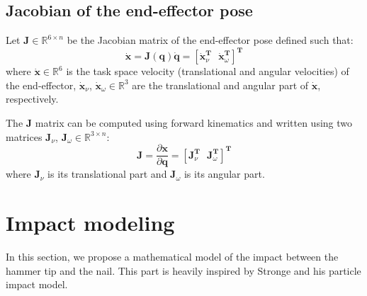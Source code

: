 \documentclass[conference]{IEEEtran}
\begin{document}
\subsection{Jacobian of the end-effector pose}
\noindent
Let $\mathbf{J} \in \mathbb{R}^{6 \times n}$ be the Jacobian matrix of the end-effector pose defined such that:
\begin{equation}
    \mathbf{\dot x} = \mathbf{J(q) \dot q} = \left[\mathbf{\dot x}_\nu^\mathbf{T} \ \ \ \mathbf{\dot x}_\omega^\mathbf{T} \right]^\mathbf{T}
\label{map xdot qdot}
\end{equation}
where $\mathbf{\dot x} \in \mathbb{R}^6$ is the task space velocity (translational and angular velocities) of the end-effector,  
$\mathbf{\dot x}_\nu$, $\mathbf{\dot x}_\omega \in \mathbb{R}^3$ are the translational and angular part of $\mathbf{\dot x}$, respectively.

The $\mathbf{J}$ matrix can be computed using forward kinematics and written using two matrices $\mathbf{J}_\nu$, $\mathbf{J}_\omega \in \mathbb{R}^{3 \times n}$:
\begin{equation}
    \mathbf{J} = \frac{\partial \mathbf{x}}{ \partial \mathbf{q}} 
            =\left[\mathbf{J}_\nu^{\mathbf{T}} \ \ \ \mathbf{J}_\omega^{\mathbf{T}}\right]^{\mathbf{T}}
\end{equation}
where $\mathbf{J}_\nu$ is its translational part and $\mathbf{J}_\omega$ is its angular part.
\section{Impact modeling}
\label{Impact modeling}
\noindent
In this section, we propose a mathematical model of the impact between the hammer tip and the nail. This part is heavily inspired by Stronge \cite{STRONGE} and his particle impact model. 
\end{document}
